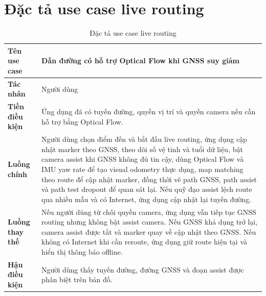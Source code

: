 \documentclass[../DoAn.tex]{subfiles}
\begin{document}
\section{Đặc tả use case live routing}
\begin{table}[H]
\centering
\begin{tabular}{|p{4cm}|p{9cm}|}
\hline
\textbf{Tên use case} & Dẫn đường có hỗ trợ Optical Flow khi GNSS suy giảm \\ \hline
\textbf{Tác nhân} & Người dùng \\ \hline
\textbf{Tiền điều kiện} & Ứng dụng đã có tuyến đường, quyền vị trí và quyền camera nếu cần hỗ trợ bằng Optical Flow. \\ \hline
\textbf{Luồng chính} & Người dùng chọn điểm đến và bắt đầu live routing, ứng dụng cập nhật marker theo GNSS, theo dõi số vệ tinh và tuổi dữ liệu, bật camera assist khi GNSS không đủ tin cậy, dùng Optical Flow và IMU yaw rate để tạo visual odometry thực dụng, map matching theo route để cập nhật marker, đồng thời vẽ path GNSS, path assist và path test dropout để quan sát lại. Nếu quỹ đạo assist lệch route qua nhiều mẫu và có Internet, ứng dụng cập nhật lại tuyến đường. \\ \hline
\textbf{Luồng thay thế} & Nếu người dùng từ chối quyền camera, ứng dụng vẫn tiếp tục GNSS routing nhưng không bật assist camera. Nếu GNSS khả dụng trở lại, camera assist được tắt và marker quay về cập nhật theo GNSS. Nếu không có Internet khi cần reroute, ứng dụng giữ route hiện tại và hiển thị thông báo offline. \\ \hline
\textbf{Hậu điều kiện} & Người dùng thấy tuyến đường, đường GNSS và đoạn assist được phân biệt trên bản đồ. \\ \hline
\end{tabular}
\caption{Đặc tả use case live routing}
\end{table}
\end{document}
